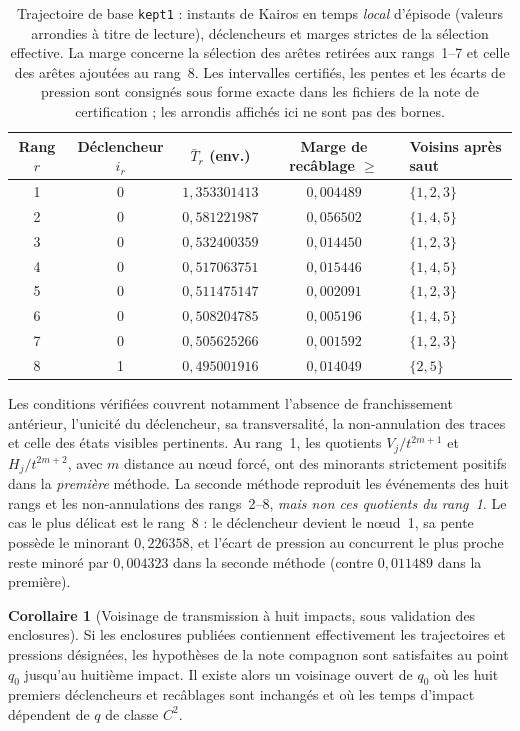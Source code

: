 \documentclass[11pt,a4paper]{article}
\theoremstyle{definition}
\newtheorem{corollary}[definition]{Corollaire}
\theoremstyle{remark}
\begin{document}
\begin{table}[H]
\centering\small
\setlength{\tabcolsep}{5pt}
\begin{tabular}{@{}c c c c l@{}}
\toprule
Rang $r$ & Déclencheur $i_r$ & $\bar T_r$ (env.) & Marge de recâblage $\ge$ & Voisins après saut\\
\midrule
1 & 0 & $1{,}353301413$ & $0{,}004489$ & $\{1,2,3\}$\\
2 & 0 & $0{,}581221987$ & $0{,}056502$ & $\{1,4,5\}$\\
3 & 0 & $0{,}532400359$ & $0{,}014450$ & $\{1,2,3\}$\\
4 & 0 & $0{,}517063751$ & $0{,}015446$ & $\{1,4,5\}$\\
5 & 0 & $0{,}511475147$ & $0{,}002091$ & $\{1,2,3\}$\\
6 & 0 & $0{,}508204785$ & $0{,}005196$ & $\{1,4,5\}$\\
7 & 0 & $0{,}505625266$ & $0{,}001592$ & $\{1,2,3\}$\\
8 & 1 & $0{,}495001916$ & $0{,}014049$ & $\{2,5\}$\\
\bottomrule
\end{tabular}
\caption{Trajectoire de base \texttt{kept1} : instants de Kairos en temps \emph{local} d'épisode (valeurs arrondies à titre de lecture), déclencheurs et marges strictes de la sélection effective. La marge concerne la sélection des arêtes retirées aux rangs~1--7 et celle des arêtes ajoutées au rang~8. Les intervalles certifiés, les pentes et les écarts de pression sont consignés sous forme exacte dans les fichiers de la note de certification ; les arrondis affichés ici ne sont pas des bornes.}
\label{tab:certification-huit-kairos}
\end{table}

Les conditions vérifiées couvrent notamment l'absence de franchissement antérieur, l'unicité du déclencheur, sa transversalité, la non-annulation des traces et celle des états visibles pertinents. Au rang~1, les quotients $V_j/t^{2m+1}$ et $H_j/t^{2m+2}$, avec $m$ distance au nœud forcé, ont des minorants strictement positifs dans la \emph{première} méthode. La seconde méthode reproduit les événements des huit rangs et les non-annulations des rangs~2--8, \emph{mais non ces quotients du rang~1}. Le cas le plus délicat est le rang~8 : le déclencheur devient le nœud~1, sa pente possède le minorant $0{,}226358$, et l'écart de pression au concurrent le plus proche reste minoré par $0{,}004323$ dans la seconde méthode (contre $0{,}011489$ dans la première).

\begin{corollary}[Voisinage de transmission à huit impacts, sous validation des enclosures]
\label{cor:transmission-huit-kairos}
Si les enclosures publiées contiennent effectivement les trajectoires et pressions désignées, les hypothèses de la note compagnon sont satisfaites au point $q_0$ jusqu'au huitième impact. Il existe alors un voisinage ouvert de $q_0$ où les huit premiers déclencheurs et recâblages sont inchangés et où les temps d'impact dépendent de $q$ de classe $C^2$.
\end{corollary}
\end{document}

